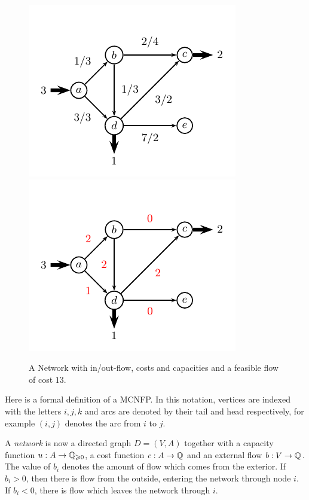 \begin{figure}
  \centering
  \includegraphics{figures/flows1.pdf}   \includegraphics{figures/flows2.pdf} 
  \caption{A Network with in/out-flow, costs and capacities and a
    feasible flow of cost $13$. }
  \label{ex:net:1}
\end{figure}

 


Here is a formal definition of a MCNFP. In
this notation, vertices are indexed with the letters $i,j,k$ and arcs 
are denoted by their tail and head respectively, for example
$(i,j)$ denotes the arc from $i$ to $j$. 
  

 A \emph{network} is now a
directed graph $D = (V,A)$ together with a capacity function $u: A \to
\mathbb{Q}_{\geqslant0}$, a cost function $c: A \to\mathbb{Q}$ and an external flow $b: V \to \mathbb{Q}$.
The value of $b_i$ denotes the amount of flow which comes from the
exterior. If $b_i>0$, then there is flow from the outside, entering
the network through node $i$. If $b_i<0$, there is flow which leaves
the network through $i$.

